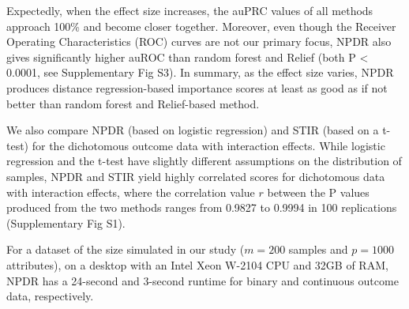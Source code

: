 \documentclass[10pt]{article}
\begin{document}
Expectedly, when the effect size increases, the auPRC values of all methods approach 100\% and become closer together.
Moreover, even though the Receiver Operating Characteristics (ROC) curves are not our primary focus, NPDR also gives significantly higher auROC than random forest and Relief (both P < 0.0001, see Supplementary Fig S3).
In summary, as the effect size varies, NPDR produces distance regression-based importance scores at least as good as if not better than random forest and Relief-based method.

We also compare NPDR (based on logistic regression) and STIR (based on a t-test) for the dichotomous outcome data with interaction effects.
While logistic regression and the t-test have slightly different assumptions on the distribution of samples, NPDR and STIR yield highly correlated scores for dichotomous data with interaction effects, where the correlation value $r$ between the P values produced from the two methods ranges from 0.9827 to 0.9994 in 100 replications (Supplementary Fig S1). 

For a dataset of the size simulated in our study ($m=200$ samples and $p=1000$ attributes), on a desktop with an Intel Xeon W-2104 CPU and 32GB of RAM, NPDR has a 24-second and 3-second runtime for binary and continuous outcome data, respectively.
\end{document}
